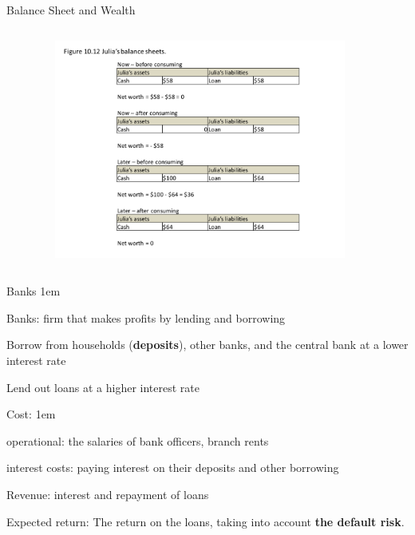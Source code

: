 \documentclass[11pt,aspectratio=43,usenames,dvipsnames]{beamer}
\let\olditemize=\itemize
\let\endolditemize=\enditemize
\renewenvironment{itemize}{\olditemize \itemsep1em}{\endolditemize}
\theoremstyle{definition}
\begin{document}
\begin{frame}{Balance Sheet and Wealth}
\label{slide:Balance_Sheet_and_Wealth}
    \begin{columns}
        \begin{column}{0.1\textwidth}
        \end{column}
        \begin{column}{0.9\textwidth}
            \begin{figure}
                \centering
                \includegraphics[trim={1.5cm 0.5cm 1.5cm 1.5cm}, clip, width=0.9\textwidth]{./figures/Figure14.pdf}
            \end{figure}
        \end{column}
    \end{columns}


\end{frame}

\begin{frame}{Banks}
\label{slide:Banks}
    \begin{itemize}
        \item Banks: firm that makes profits by lending and borrowing
        \item \alert{Borrow} from households (\textbf{deposits}), other banks, and the central bank at a \alert{lower} interest rate
        \item \alert{Lend} out loans at a \alert{higher} interest rate
        \item \alert{Cost}:
        \begin{itemize}
            \item operational: the salaries of bank officers, branch rents
            \item interest costs: paying interest on their deposits and other borrowing
        \end{itemize}
        \item \alert{Revenue}: interest and repayment of loans
        \item \alert{Expected return}: The return on the loans, taking into account \textbf{the default risk}.
    \end{itemize}
\end{frame}
\end{document}
